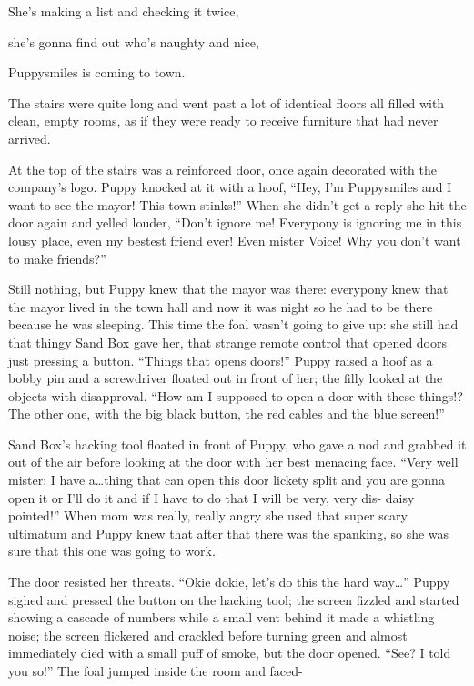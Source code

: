 \begin{song}
She's making a list and checking it twice,

she's gonna find out who's naughty and nice,

Puppysmiles is coming to town.
\end{song}

The stairs were quite long and went past a lot of identical floors all filled with clean, empty rooms, as if they were ready to receive furniture that had never arrived.

At the top of the stairs was a reinforced door, once again decorated with the company's logo. Puppy knocked at it with a hoof, ``Hey, I'm Puppysmiles and I want to see the mayor! This town stinks!'' When she didn't get a reply she hit the door again and yelled louder, ``Don't ignore me! Everypony is ignoring me in this lousy place, even my bestest friend ever! Even mister Voice! Why you don't want to make friends?''

Still nothing, but Puppy knew that the mayor was there: everypony knew that the mayor lived in the town hall and now it was night so he had to be there because he was sleeping. This time the foal wasn't going to give up: she still had that thingy Sand Box gave her, that strange remote control that opened doors just pressing a button. ``Things that opens doors!'' Puppy raised a hoof as a bobby pin and a screwdriver floated out in front of her; the filly looked at the objects with disapproval. ``How am I supposed to open a door with these things!? The other one, with the big black button, the red cables and the blue screen!''

Sand Box's hacking tool floated in front of Puppy, who gave a nod and grabbed it out of the air before looking at the door with her best menacing face. ``Very well mister: I have a\dots thing that can open this door lickety split and you are gonna open it or I'll do it and if I have to do that I will be very, very dis- daisy pointed!'' When mom was really, really angry she used that super scary ultimatum and Puppy knew that after that there was the spanking, so she was sure that this one was going to work.

The door resisted her threats. ``Okie dokie, let's do this the hard way\dots'' Puppy sighed and pressed the button on the hacking tool; the screen fizzled and started showing a cascade of numbers while a small vent behind it made a whistling noise; the screen flickered and crackled before turning green and almost immediately died with a small puff of smoke, but the door opened. ``See? I told you so!'' The foal jumped inside the room and faced-

